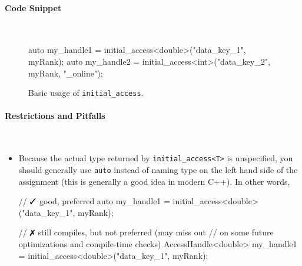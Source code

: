 \paragraph{Code Snippet}\mbox{}\\
\begin{figure}[!h]
\begin{CppCodeNumb}
  auto my_handle1 = initial_access<double>("data_key_1", myRank);
  auto my_handle2 = initial_access<int>("data_key_2", myRank, "_online");
\end{CppCodeNumb}
\label{fig:fe_api_initialaccess}
\caption{Basic usage of \texttt{initial\_access}.}
\end{figure}

\paragraph{Restrictions and Pitfalls}\mbox{}\\ 
\begin{itemize}
  \item Because the actual type returned by \texttt{initial\_access<T>} is
  unspecified, you should generally use \texttt{auto} instead of naming type on 
  the left hand side of the assignment (this is generally a good idea in modern
  C++). In other words,
  \begin{CppCode}
	// $\yes$ good, preferred
	auto my_handle1 = initial_access<double>("data_key_1", myRank); 

	// $\no$ still compiles, but not preferred (may miss out
	//  on some future optimizations and compile-time checks)
	AccessHandle<double> my_handle1 = initial_access<double>("data_key_1", myRank); 
  \end{CppCode}
\end{itemize}



